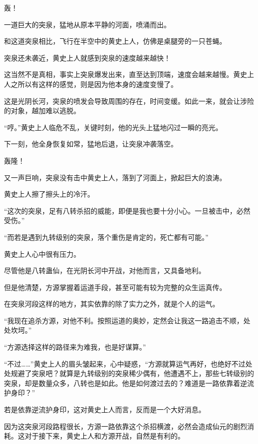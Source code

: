 
\begin{this_body}

轰！

一道巨大的突泉，猛地从原本平静的河面，喷涌而出。

和这道突泉相比，飞行在半空中的黄史上人，仿佛是桌腿旁的一只苍蝇。

突泉还未袭近，黄史上人就感到突泉的速度越来越快！

这当然不是真相，事实上突泉爆发出来，直至达到顶端，速度会越来越慢。黄史上人之所以有这样的感觉，则是因为他本身的速度变慢了。

这是光阴长河，突泉的喷发会导致周围的存在，时间变缓。如此一来，就会让涉险的对象，越加难以逃脱。

“哼。”黄史上人临危不乱，关键时刻，他的光头上猛地闪过一瞬的亮光。

下一刻，他全身恢复如常，猛地后退，让突泉冲袭落空。

轰隆！

又一声巨响，突泉没有击中黄史上人，落到了河面上，掀起巨大的浪涛。

黄史上人擦了擦头上的冷汗。

“这次的突泉，足有八转杀招的威能，即便是我也要十分小心。一旦被击中，必然受伤。”

“而若是遇到九转级别的突泉，落个重伤是肯定的，死亡都有可能。”

黄史上人心中很有压力。

尽管他是八转蛊仙，在光阴长河中开战，对他而言，又具备地利。

但是他清楚，方源掌握着运道手段，甚至可能有较为完整的众生运真传。

在突泉河段这样的地方，其实依靠的除了实力之外，就是个人的运气。

“我现在追杀方源，对他不利。按照运道的奥妙，定然会让我这一路追击不顺，处处坎坷。”

“方源选择这样的路径来为难我，也是好谋算。”

“不过……”黄史上人的眉头皱起来，心中疑惑，“方源就算运气再好，也绝好不过处处规避了突泉吧？就算是九转级别的突泉稀少偶有，他遭遇不上，那些七转级别的突泉，却是数量众多，八转也是如此。他是如何渡过去的？难道是一路依靠着逆流护身印？”

若是依靠逆流护身印，这对黄史上人而言，反而是一个大好消息。

因为这突泉河段路程很长，方源一路依靠这个杀招横渡，必然会造成仙元的剧烈消耗。这对于接下来，黄史上人和方源开战，自然是有利的。


\end{this_body}
